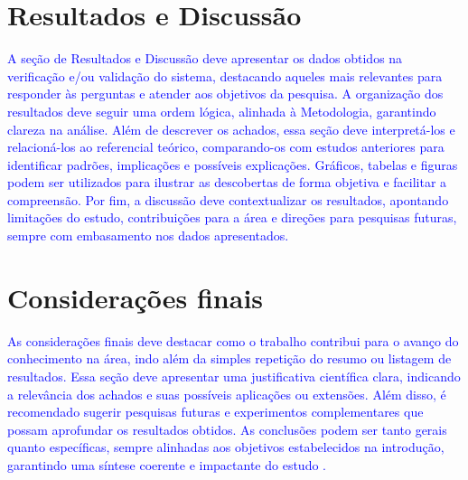 \documentclass[a4paper,12pt]{article}
\begin{document}
\section{Resultados e Discussão}

\textcolor{blue}{
A seção de Resultados e Discussão deve apresentar os dados obtidos na
verificação e/ou validação do sistema, destacando aqueles mais relevantes para
responder às perguntas e atender aos objetivos da pesquisa. A organização dos
resultados deve seguir uma ordem lógica, alinhada à Metodologia, garantindo
clareza na análise. Além de descrever os achados, essa seção deve interpretá-los
e relacioná-los ao referencial teórico, comparando-os com estudos anteriores
para identificar padrões, implicações e possíveis explicações. Gráficos, tabelas
e figuras podem ser utilizados para ilustrar as descobertas de forma objetiva e
facilitar a compreensão. Por fim, a discussão deve contextualizar os resultados,
apontando limitações do estudo, contribuições para a área e direções para
pesquisas futuras, sempre com embasamento nos dados apresentados.
}

\section{Considerações finais}

\textcolor{blue}{
As considerações finais deve destacar como o trabalho contribui para o avanço do
conhecimento na área, indo além da simples repetição do resumo ou listagem de
resultados. Essa seção deve apresentar uma justificativa científica clara,
indicando a relevância dos achados e suas possíveis aplicações ou extensões.
Além disso, é recomendado sugerir pesquisas futuras e experimentos
complementares que possam aprofundar os resultados obtidos. As conclusões podem
ser tanto gerais quanto específicas, sempre alinhadas aos objetivos
estabelecidos na introdução, garantindo uma síntese coerente e impactante do
estudo \cite{tanenbaum2023redes}.
}

\end{document}
